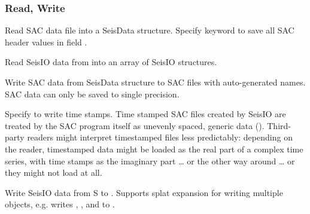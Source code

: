 \documentclass[letterpaper,11pt,english]{sphinxmanual}
\begin{document}
\subsubsection{Read, Write}
\label{\detokenize{src/seisdata:read-write}}

\begin{fulllineitems}
\end{fulllineitems}


Read SAC data file  into a SeisData structure. Specify keyword  to save all SAC header values in field .


\begin{fulllineitems}
\end{fulllineitems}


Read SeisIO data from  into an array of SeisIO structures.


\begin{fulllineitems}
\end{fulllineitems}


Write SAC data from SeisData structure  to SAC files with auto-generated names. SAC data can only be saved to single precision.

Specify  to write time stamps. Time stamped SAC files created by SeisIO are treated by the SAC program itself as unevenly spaced, generic  data (). Third-party readers might interpret timestamped files less predictably: depending on the reader, timestamped data might be loaded as the real part of a complex time series, with time stamps as the imaginary part … or the other way around … or they might not load at all.


\begin{fulllineitems}
\end{fulllineitems}


Write SeisIO data from S to . Supports splat expansion for writing multiple objects, e.g.  writes , , and  to .
\end{document}
